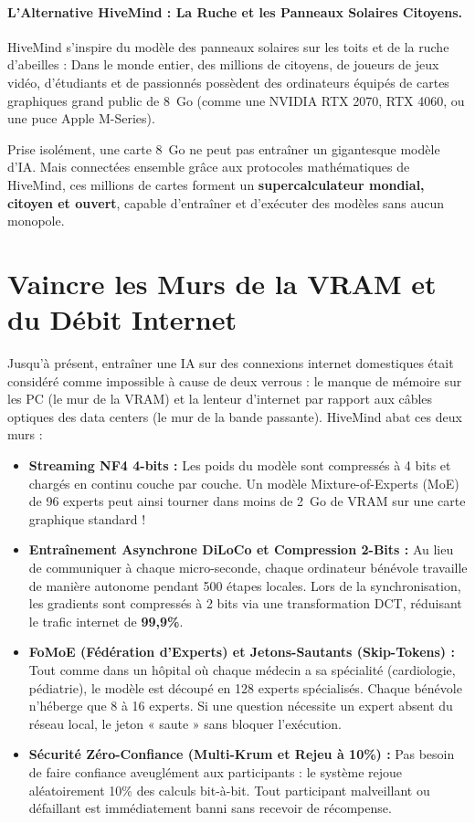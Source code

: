 \documentclass[11pt,a4paper]{report}
\begin{document}
\paragraph{L'Alternative HiveMind : La Ruche et les Panneaux Solaires Citoyens.}
HiveMind s'inspire du modèle des panneaux solaires sur les toits et de la ruche d'abeilles :
Dans le monde entier, des millions de citoyens, de joueurs de jeux vidéo, d'étudiants et de passionnés possèdent des ordinateurs équipés de cartes graphiques grand public de 8~Go (comme une NVIDIA RTX 2070, RTX 4060, ou une puce Apple M-Series). 

Prise isolément, une carte 8~Go ne peut pas entraîner un gigantesque modèle d'IA. Mais connectées ensemble grâce aux protocoles mathématiques de HiveMind, ces millions de cartes forment un \textbf{supercalculateur mondial, citoyen et ouvert}, capable d'entraîner et d'exécuter des modèles sans aucun monopole.

\section{Vaincre les Murs de la VRAM et du Débit Internet}

Jusqu'à présent, entraîner une IA sur des connexions internet domestiques était considéré comme impossible à cause de deux verrous : le manque de mémoire sur les PC (le mur de la VRAM) et la lenteur d'internet par rapport aux câbles optiques des data centers (le mur de la bande passante). HiveMind abat ces deux murs :

\begin{itemize}[leftmargin=1.8em]
    \item \textbf{Streaming NF4 4-bits :} Les poids du modèle sont compressés à 4 bits et chargés en continu couche par couche. Un modèle Mixture-of-Experts (MoE) de 96 experts peut ainsi tourner dans moins de 2~Go de VRAM sur une carte graphique standard !
    \item \textbf{Entraînement Asynchrone DiLoCo et Compression 2-Bits :} Au lieu de communiquer à chaque micro-seconde, chaque ordinateur bénévole travaille de manière autonome pendant 500 étapes locales. Lors de la synchronisation, les gradients sont compressés à 2 bits via une transformation DCT, réduisant le trafic internet de \textbf{99,9\%}.
    \item \textbf{FoMoE (Fédération d'Experts) et Jetons-Sautants (Skip-Tokens) :} Tout comme dans un hôpital où chaque médecin a sa spécialité (cardiologie, pédiatrie), le modèle est découpé en 128 experts spécialisés. Chaque bénévole n'héberge que 8 à 16 experts. Si une question nécessite un expert absent du réseau local, le jeton « saute » sans bloquer l'exécution.
    \item \textbf{Sécurité Zéro-Confiance (Multi-Krum et Rejeu à 10\%) :} Pas besoin de faire confiance aveuglément aux participants : le système rejoue aléatoirement 10\% des calculs bit-à-bit. Tout participant malveillant ou défaillant est immédiatement banni sans recevoir de récompense.
\end{itemize}
\end{document}
